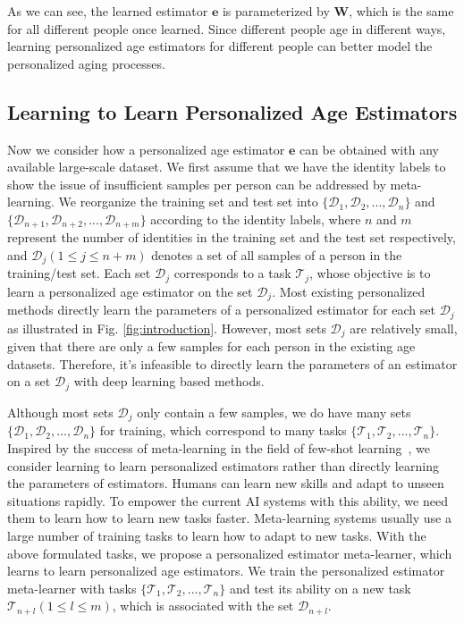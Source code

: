 \documentclass[journal,twoside]{IEEEtran}
\begin{document}
As we can see, the learned estimator $\bm{e}$ is parameterized by $\bm{W}$, which is the same for all different people once learned. Since different people age in different ways, learning personalized age estimators for different people can better model the personalized aging processes.


\subsection{Learning to Learn Personalized Age Estimators}

Now we consider how a personalized age estimator $\bm{e}$ can be obtained with any available large-scale dataset. We first assume that we have the identity labels to show the issue of insufficient samples per person can be addressed by meta-learning. We reorganize the training set and test set into $\{\mathcal{D}_1, \mathcal{D}_2, ..., \mathcal{D}_n\}$ and $\{\mathcal{D}_{n+1}, \mathcal{D}_{n+2}, ..., \mathcal{D}_{n+m}\}$ according to the identity labels, where $n$ and $m$ represent the number of identities in the training set and the test set respectively, and $\mathcal{D}_j (1 \leq j \leq n+m)$ denotes a set of all samples of a person in the training/test set. Each set $\mathcal{D}_j$ corresponds to a task $\mathcal{T}_j$, whose objective is to learn a personalized age estimator on the set $\mathcal{D}_j$. Most existing personalized methods directly learn the parameters of a personalized estimator for each set $\mathcal{D}_j$ as illustrated in Fig. \ref{fig:introduction}. 
However, most sets $\mathcal{D}_j$ are relatively small, given that there are only a few samples for each person in the existing age datasets.
Therefore, it's infeasible to directly learn the parameters of an estimator on a set $\mathcal{D}_j$ with deep learning based methods.


Although most sets $\mathcal{D}_j$ only contain a few samples, we do have many sets $\{\mathcal{D}_1, \mathcal{D}_2, ..., \mathcal{D}_n\}$ for training, which correspond to many tasks $\{\mathcal{T}_1, \mathcal{T}_2, ..., \mathcal{T}_n\}$. Inspired by the success of meta-learning in the field of few-shot learning~\cite{finn2017model}, we consider learning to learn personalized estimators rather than directly learning the parameters of estimators. Humans can learn new skills and adapt to unseen situations rapidly. To empower the current AI systems with this ability, we need them to learn how to learn new tasks faster. Meta-learning systems usually use a large number of training tasks to learn how to adapt to new tasks. With the above formulated tasks, we propose a personalized estimator meta-learner, which learns to learn personalized age estimators. We train the personalized estimator meta-learner with tasks $\{\mathcal{T}_1, \mathcal{T}_2, ..., \mathcal{T}_n\}$ and test its ability on a new task $\mathcal{T}_{n + l} (1 \leq l \leq m)$, which is associated with the set $\mathcal{D}_{n+l}$.
\end{document}
